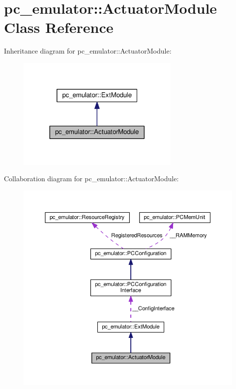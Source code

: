 \hypertarget{classpc__emulator_1_1ActuatorModule}{}\section{pc\+\_\+emulator\+:\+:Actuator\+Module Class Reference}
\label{classpc__emulator_1_1ActuatorModule}


Inheritance diagram for pc\+\_\+emulator\+:\+:Actuator\+Module\+:
\nopagebreak
\begin{figure}[H]
\begin{center}
\leavevmode
\includegraphics[width=224pt]{classpc__emulator_1_1ActuatorModule__inherit__graph}
\end{center}
\end{figure}


Collaboration diagram for pc\+\_\+emulator\+:\+:Actuator\+Module\+:
\nopagebreak
\begin{figure}[H]
\begin{center}
\leavevmode
\includegraphics[width=350pt]{classpc__emulator_1_1ActuatorModule__coll__graph}
\end{center}
\end{figure}

